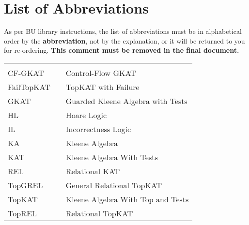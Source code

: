 \begin{abstractpage}

\end{abstractpage}
\cleardoublepage


\tableofcontents
\cleardoublepage

\newpage
\listoftables
\cleardoublepage

\newpage
\listoffigures
\cleardoublepage

\chapter*{List of Abbreviations}

{\color{red} As per BU library instructions, the list of abbreviations must be in alphabetical order by the {\bf abbreviation}, not by the explanation, or it will be returned to you for re-ordering. {\bf This comment must be removed in the final document.}}

\begin{center}
  \begin{tabular}{lll}
    \hspace*{2em} & \hspace*{1in} & \hspace*{4.5in} \\
    CF-GKAT  & \dotfill & Control-Flow GKAT \\
    FailTopKAT & \dotfill & TopKAT with Failure \\
    GKAT   & \dotfill & Guarded Kleene Algebra with Tests \\
    HL & \dotfill & Hoare Logic \\
    IL & \dotfill & Incorrectness Logic\\
    KA  & \dotfill & Kleene Algebra \\
    KAT & \dotfill & Kleene Algebra With Tests \\
    REL & \dotfill & Relational KAT \\
    TopGREL & \dotfill & General Relational TopKAT\\
    TopKAT & \dotfill & Kleene Algebra With Top and Tests\\
    TopREL & \dotfill & Relational TopKAT \\
  \end{tabular}
\end{center}
\cleardoublepage


\newpage
\endofprelim

